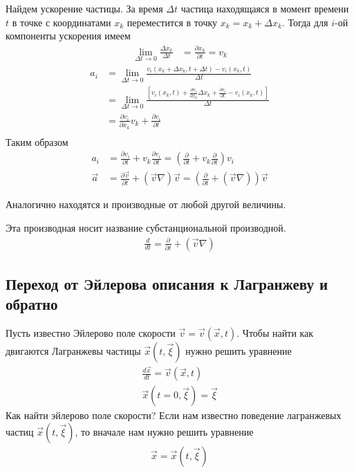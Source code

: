 Найдем ускорение частицы. За время $ \Delta t $ частица находящаяся в момент времени $t$ в точке с координатами $ x_{k} $ переместится в точку $ x_{k}=x_{k}+\Delta x_{k} $. Тогда для $i$-ой компоненты ускорения имеем
\begin{align*} 
\lim _{\Delta t \rightarrow 0} \frac{\Delta x_{k}}{\Delta t} &=\frac{\partial x_{k}}{\partial t}=v_{k} 
\end{align*}
\begin{align*}
a_{i} &=\lim _{\Delta t \rightarrow 0} \frac{v_{i}\left(x_{k}+\Delta x_{k}, t+\Delta t\right)-v_{i}\left(x_{k}, t\right)}{\Delta t} \\
&=\lim _{\Delta t \rightarrow 0}\frac{\left[v_{i}\left(x_{k}, t\right)+\frac{\partial v_{i}}{\partial x_{k}} \Delta x_{k}+\frac{\partial v_{i}}{\partial t}-v_{i}\left(x_{k}, t\right)\right]}{\Delta t} \\
&=\frac{\partial v_{i}}{\partial x_{k}} v_{k}+\frac{\partial v_{i}}{\partial t} \\
\end{align*}
Таким образом 
\begin{align*} 
a_{i} &=\frac{\partial v_{i}}{\partial t}+v_{k} \frac{\partial v_{i}}{\partial t}=\left(\frac{\partial}{\partial t}+v_{k} \frac{\partial}{\partial t}\right) v_{i} \\
\vec{a} &=\frac{\partial \vec{v}}{\partial t}+(\vec{v} \nabla) \vec{v}=\left(\frac{\partial}{\partial t}+(\vec{v} \nabla)\right) \vec{v}
\end{align*}

Аналогично находятся и производные от любой другой величины.

Эта производная носит название субстанциональной производной.
\begin{align*} 
\frac{d}{d t}=\frac{\partial}{\partial t}+(\vec{v} \nabla)
\end{align*}
\subsection{Переход от Эйлерова описания к Лагранжеву и обратно}
Пусть известно Эйлерово поле скорости $ \vec{v}=\vec{v}(\vec{x}, t) $. Чтобы найти как двигаются Лагранжевы частицы $ \vec{x}(t, \vec{\xi}) $ нужно решить уравнение
\begin{align*} 
\frac{d \vec{x}}{d t}=\vec{v}(\vec{x}, t) \\
\vec{x}(t=0, \vec{\xi})=\vec{\xi}
\end{align*}
Как найти эйлерово поле скорости? Если нам известно поведение лагранжевых частиц $ \vec{x}(t, \vec{\xi}) $, то вначале нам нужно решить уравнение 
\begin{align*} 
\vec{x}=\vec{x}(t, \vec{\xi})
\end{align*}

